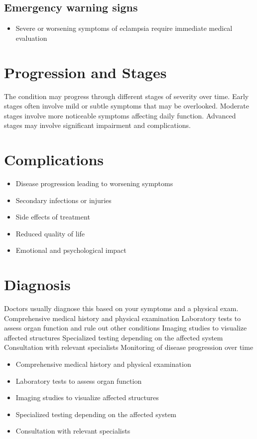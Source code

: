 \subsection{Emergency warning signs}
\begin{itemize}[noitemsep]
  \item Severe or worsening symptoms of eclampsia require immediate medical evaluation
\end{itemize}
\section{Progression and Stages}
The condition may progress through different stages of severity over time. Early stages often involve mild or subtle symptoms that may be overlooked. Moderate stages involve more noticeable symptoms affecting daily function. Advanced stages may involve significant impairment and complications.
\section{Complications}
\begin{itemize}[noitemsep]
  \item Disease progression leading to worsening symptoms
  \item Secondary infections or injuries
  \item Side effects of treatment
  \item Reduced quality of life
  \item Emotional and psychological impact
\end{itemize}
\section{Diagnosis}
Doctors usually diagnose this based on your symptoms and a physical exam. Comprehensive medical history and physical examination Laboratory tests to assess organ function and rule out other conditions Imaging studies to visualize affected structures Specialized testing depending on the affected system Consultation with relevant specialists Monitoring of disease progression over time

\begin{itemize}[noitemsep]
  \item Comprehensive medical history and physical examination
  \item Laboratory tests to assess organ function
  \item Imaging studies to visualize affected structures
  \item Specialized testing depending on the affected system
  \item Consultation with relevant specialists
\end{itemize}
